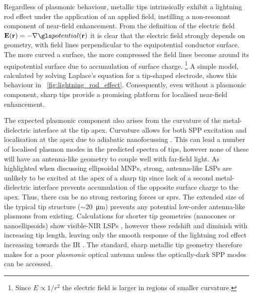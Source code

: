 \documentclass{article}
\begin{document}
Regardless of plasmonic behaviour, metallic tips intrinsically exhibit a lightning rod effect under the application of an applied field, instilling a non-resonant component of near-field enhancement. From the definition of the electric field $\vec{E}(\vec{r}) = -\nabla\pot(\vec{r})$ it is clear that the electric field strongly depends on geometry, with field lines perpendicular to the equipotential conductor surface. The more curved a surface, the more compressed the field lines become around its equipotential surface due to accumulation of surface charge.%
\footnote{Since $E \propto 1/r^2$ the electric field is larger in regions of smaller curvature.}
A simple model, calculated by solving Laplace's equation for a tip-shaped electrode, shows this behaviour in \figurename~\ref{fig:lightning_rod_effect}. Consequently, even without a plasmonic component, sharp tips provide a promising platform for localised near-field enhancement.

The expected plasmonic component also arises from the curvature of the metal-dielectric interface at the tip apex. Curvature allows for both SPP excitation and localisation at the apex due to adiabatic nanofocussing \cite{stockman2004, pile2006, berweger2010, lee2011, berweger2012, lindquist2013}. This can lead a number of localised plasmon modes in the predicted spectra of tips, however none of these will have an antenna-like geometry to couple well with far-field light. As highlighted when discussing ellipsoidal MNPs, strong, antenna-like LSPs are unlikely to be excited at the apex of a sharp tip since lack of a second metal-dielectric interface prevents accumulation of the opposite surface charge to the apex. Thus, there can be no strong restoring forces or \glspl{spr}. The extended size of the typical tip structure ($\sim$\SI{20}{\micro\metre}) prevents any potential low-order antenna-like plasmons from existing. Calculations for shorter tip geometries (nanocones or nanoellipsoids) show visible-NIR LSPs \cite{roth2006, goncharenko2006}, however these redshift and diminish with increasing tip length, leaving only the smooth response of the lightning rod effect increasing towards the IR \cite{zhang2009, huber2014}. The standard, sharp metallic tip geometry therefore makes for a poor \textit{plasmonic} optical antenna unless the optically-dark SPP modes can be accessed.
\end{document}
